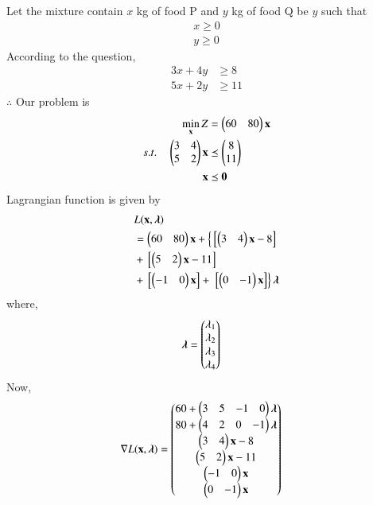 
\begin{table}[!ht]
\centering
{}
\caption{Food Requirements}
\label{opt/12/tab:table1}
\end{table}
Let the mixture contain $x$ kg of food P and $y$ kg of food Q be $y$  such that 
\begin{align}
    x \geq 0 \\
    y \geq 0 
\end{align}
According to the question,
\begin{align}
    3x+4y &\geq 8 \\
    5x+2y &\geq 11
\end{align}
$\therefore$ Our problem is
\begin{align}
        \min_{\mathbf{x}} Z &= \begin{pmatrix}60 & 80\end{pmatrix}\mathbf{x}\\
        s.t. \quad 
        \begin{pmatrix}3 & 4 \\ 5 & 2 \end{pmatrix}\mathbf{x} &\preceq \begin{pmatrix}8\\11\end{pmatrix} \\
        \mathbf{x} &\preceq \mathbf{0}
\end{align}
Lagrangian function is given by
\begin{equation}
\begin{aligned}
    &L(\mathbf{x},\boldsymbol{\lambda}) \\ &= \begin{pmatrix}60 & 80\end{pmatrix}\mathbf{x}+\left\{{}\left[\begin{pmatrix}3 & 4\end{pmatrix}\mathbf{x}-8\right]\right. \\ &+ {}\left[\begin{pmatrix}5 & 2\end{pmatrix}\mathbf{x}-11\right] \\ &+ {}\left[\begin{pmatrix}-1 & 0\end{pmatrix}\mathbf{x}\right] +\left.{}\left[\begin{pmatrix}0 & -1\end{pmatrix}\mathbf{x}\right]\right\}\boldsymbol{\lambda}
\end{aligned}
\end{equation}
where,
\begin{align}
    \boldsymbol{\lambda} &= \begin{pmatrix}\lambda_1 \\ \lambda_2 \\ \lambda_3 \\ \lambda_4\end{pmatrix}
\end{align}
Now,
\begin{align}
    \nabla L(\mathbf{x},\boldsymbol{\lambda}) &= \begin{pmatrix}60+ \begin{pmatrix}3 & 5 & -1 & 0 \end{pmatrix}\boldsymbol{\lambda}\\ 80+\begin{pmatrix}4 & 2 & 0 & -1\end{pmatrix}\boldsymbol{\lambda} \\ \begin{pmatrix}3 & 4\end{pmatrix}\mathbf{x}-8 \\ \begin{pmatrix}5 & 2\end{pmatrix}\mathbf{x}-11 \\ \begin{pmatrix}-1 & 0\end{pmatrix}\mathbf{x} \\ \begin{pmatrix}0 & -1\end{pmatrix}\mathbf{x}\end{pmatrix}
\end{align}
